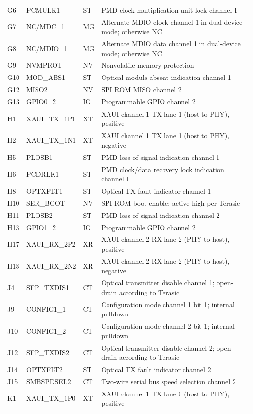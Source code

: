 \documentclass[10pt,a4paper]{article}
\begin{document}
\begin{longtable}{@{}p{12mm}p{44mm}p{10mm}p{91mm}@{}}
G6 & PCMULK1 & ST & PMD clock multiplication unit lock channel 1\\
G7 & NC/MDC\_1 & MG & Alternate MDIO clock channel 1 in dual-device mode; otherwise NC\\
G8 & NC/MDIO\_1 & MG & Alternate MDIO data channel 1 in dual-device mode; otherwise NC\\
G9 & NVMPROT & NV & Nonvolatile memory protection\\
G10 & MOD\_ABS1 & ST & Optical module absent indication channel 1\\
G12 & MISO2 & NV & SPI ROM MISO channel 2\\
G13 & GPIO0\_2 & IO & Programmable GPIO channel 2\\
H1 & XAUI\_TX\_1P1 & XT & XAUI channel 1 TX lane 1 (host to PHY), positive\\
H2 & XAUI\_TX\_1N1 & XT & XAUI channel 1 TX lane 1 (host to PHY), negative\\
H5 & PLOSB1 & ST & PMD loss of signal indication channel 1\\
H6 & PCDRLK1 & ST & PMD clock/data recovery lock indication channel 1\\
H8 & OPTXFLT1 & ST & Optical TX fault indicator channel 1\\
H10 & SER\_BOOT & NV & SPI ROM boot enable; active high per Terasic\\
H11 & PLOSB2 & ST & PMD loss of signal indication channel 2\\
H13 & GPIO1\_2 & IO & Programmable GPIO channel 2\\
H17 & XAUI\_RX\_2P2 & XR & XAUI channel 2 RX lane 2 (PHY to host), positive\\
H18 & XAUI\_RX\_2N2 & XR & XAUI channel 2 RX lane 2 (PHY to host), negative\\
J4 & SFP\_TXDIS1 & CT & Optical transmitter disable channel 1; open-drain according to Terasic\\
J9 & CONFIG1\_1 & CT & Configuration mode channel 1 bit 1; internal pulldown\\
J10 & CONFIG1\_2 & CT & Configuration mode channel 2 bit 1; internal pulldown\\
J12 & SFP\_TXDIS2 & CT & Optical transmitter disable channel 2; open-drain according to Terasic\\
J14 & OPTXFLT2 & ST & Optical TX fault indicator channel 2\\
J15 & SMBSPDSEL2 & CT & Two-wire serial bus speed selection channel 2\\
K1 & XAUI\_TX\_1P0 & XT & XAUI channel 1 TX lane 0 (host to PHY), positive\\

\end{longtable}
\end{document}
